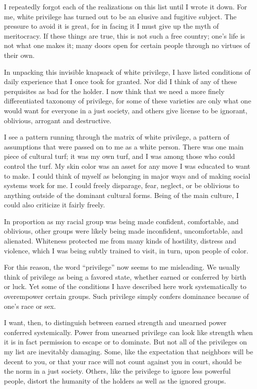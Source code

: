 \documentclass{article}
\begin{document}
I repeatedly forgot each of the realizations on this list until I wrote it
down.  For me, white privilege has turned out to be an elusive and fugitive
subject.  The pressure to avoid it is great, for in facing it I must give up
the myth of meritocracy. If these things are true, this is not such a free
country; one's life is not what one makes it; many doors open for certain
people through no virtues of their own.

In unpacking this invisible knapsack of white privilege, I have listed
conditions of daily experience that I once took for granted. Nor did I think of
any of these perquisites as bad for the holder. I now think that we need a more
finely differentiated taxonomy of privilege, for some of these varieties are
only what one would want for everyone in a just society, and others give
license to be ignorant, oblivious, arrogant and destructive.

I see a pattern running through the matrix of white privilege, a pattern of
assumptions that were passed on to me as a white person. There was one main
piece of cultural turf; it was my own turf, and I was among those who could
control the turf. My skin color was an asset for any move I was educated to
want to make. I could think of myself as belonging in major ways and of making
social systems work for me. I could freely disparage, fear, neglect, or be
oblivious to anything outside of the dominant cultural forms. Being of the main
culture, I could also criticize it fairly freely.

In proportion as my racial group was being made confident, comfortable, and
oblivious, other groups were likely being made inconfident, uncomfortable, and
alienated. Whiteness protected me from many kinds of hostility, distress and
violence, which I was being subtly trained to visit, in turn, upon people of
color.

For this reason, the word ``privilege'' now seems to me misleading. We usually
think of privilege as being a favored state, whether earned or conferred by
birth or luck. Yet some of the conditions I have described here work
systematically to overempower certain groups. Such privilege simply confers
dominance because of one's race or sex.

I want, then, to distinguish between earned strength and unearned power
conferred systemically. Power from unearned privilege can look like strength
when it is in fact permission to escape or to dominate. But not all of the
privileges on my list are inevitably damaging. Some, like the expectation that
neighbors will be decent to you, or that your race will not count against you
in court, should be the norm in a just society. Others, like the privilege to
ignore less powerful people, distort the humanity of the holders as well as the
ignored groups.
\end{document}
